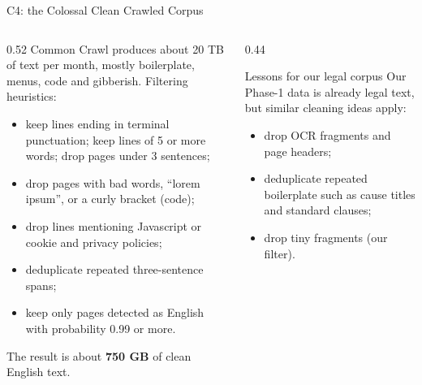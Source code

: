 \documentclass[aspectratio=169,11pt]{beamer}
\begin{document}
\begin{frame}{C4: the Colossal Clean Crawled Corpus}
  \begin{columns}[T]
    \begin{column}{0.52\textwidth}
      \small
      Common Crawl produces about 20 TB of text per month, mostly boilerplate, menus, code and gibberish. Filtering heuristics:
      \begin{itemize}
        \item keep lines ending in terminal punctuation; keep lines of 5 or more words; drop pages under 3 sentences;
        \item drop pages with bad words, ``lorem ipsum'', or a curly bracket (code);
        \item drop lines mentioning Javascript or cookie and privacy policies;
        \item deduplicate repeated three-sentence spans;
        \item keep only pages detected as English with probability 0.99 or more.
      \end{itemize}
      The result is about \textbf{750 GB} of clean English text.
    \end{column}
    \begin{column}{0.44\textwidth}
      \begin{exampleblock}{Lessons for our legal corpus}
        \small
        Our Phase-1 data is already legal text, but similar cleaning ideas apply:
        \begin{itemize}
          \item drop OCR fragments and page headers;
          \item deduplicate repeated boilerplate such as cause titles and standard clauses;
          \item drop tiny fragments (our  filter).
        \end{itemize}
      \end{exampleblock}
    \end{column}
  \end{columns}
\end{frame}
\end{document}
